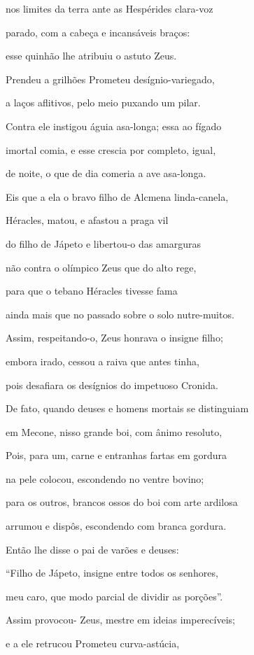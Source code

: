 \begin{pages}
\begin{Rightside}
nos limites da terra ante as Hespérides clara-voz

parado, com a cabeça e incansáveis braços:

esse quinhão lhe atribuiu o astuto Zeus. 

Prendeu a grilhões Prometeu desígnio-variegado,

a laços aflitivos, pelo meio puxando um pilar.

Contra ele instigou águia asa-longa; essa ao fígado

imortal comia, e esse crescia por completo, igual,

de noite, o que de dia comeria a ave asa-longa. 

Eis que a ela o bravo filho de Alcmena linda-canela,

Héracles, matou, e afastou a praga vil

do filho de Jápeto e libertou-o das amarguras

não contra o olímpico Zeus que do alto rege,

para que o tebano Héracles tivesse fama 

ainda mais que no passado sobre o solo nutre-muitos.

Assim, respeitando-o, Zeus honrava o insigne filho;

embora irado, cessou a raiva que antes tinha,

pois desafiara os desígnios do impetuoso Cronida.

\quad{}De fato, quando deuses e homens mortais se distinguiam 

em Mecone, nisso grande boi, com ânimo resoluto,


Pois, para um, carne e entranhas fartas em gordura

na pele colocou, escondendo no ventre bovino;

para os outros, brancos ossos do boi com arte ardilosa 

arrumou e dispôs, escondendo com branca gordura.

\quad{}Então lhe disse o pai de varões e deuses:

``Filho de Jápeto, insigne entre todos os senhores,

meu caro, que modo parcial de dividir as porções''.

\quad{}Assim provocou- Zeus, mestre em ideias imperecíveis; 

e a ele retrucou Prometeu curva-astúcia,


\end{Rightside}
\end{pages}
